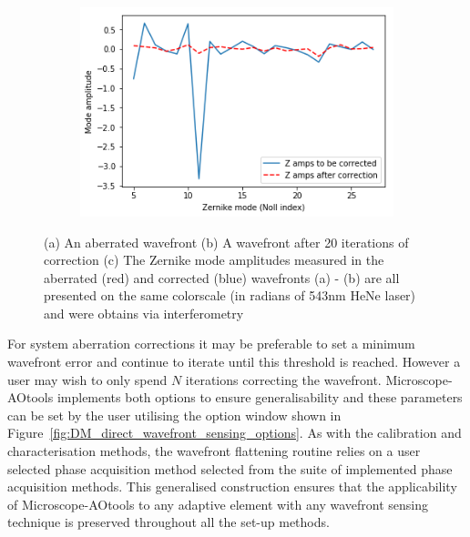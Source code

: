 \begin{figure}[h]
	\begin{subfigure}{0.55\textwidth}
		\centering
		\includegraphics[width=1\linewidth, scale=1]{./images/Zernike_modes_before_after_correction_only_corrected.png}
		\caption{}
		\label{fig:zernike_modes_to_show_flattening}
	\end{subfigure}
	\caption{(a) An aberrated wavefront (b) A wavefront after 20 iterations of correction (c) The Zernike mode amplitudes measured in the aberrated (red) and corrected (blue) wavefronts (a) - (b) are all presented on the same colorscale (in radians of 543nm HeNe laser) and were obtains via interferometry}
	\label{fig:direct_wavefront_correction}
\end{figure}

For system aberration corrections it may be preferable to set a minimum wavefront error and continue to iterate until this threshold is reached. However a user may wish to only spend $N$ iterations correcting the wavefront. Microscope-AOtools implements both options to ensure generalisability and these parameters can be set by the user utilising the option window shown in Figure~\ref{fig:DM_direct_wavefront_sensing_options}. As with the calibration and characterisation methods, the wavefront flattening routine relies on a user selected phase acquisition method selected from the suite of implemented phase acquisition methods. This generalised construction ensures that the applicability of Microscope-AOtools to any adaptive element with any wavefront sensing technique is preserved throughout all the set-up methods.

